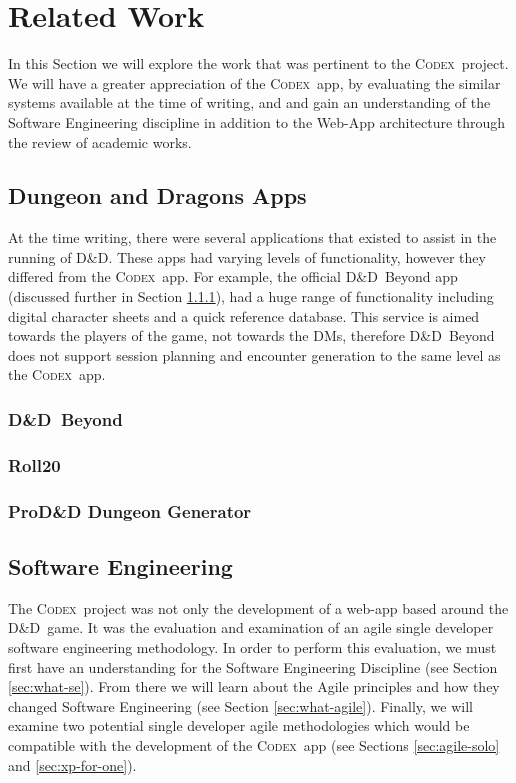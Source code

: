 \documentclass[final]{cmpreport}
\newcommand{\dnd}{D\&D}
\newcommand{\Codex}{\textsc{Codex}}
\begin{document}
	\section{Related Work} \label{sec:related}
	In this Section we will explore the work that was pertinent to the \Codex \ project. We will have a greater appreciation of the \Codex \ app, by evaluating the similar systems available at the time of writing, and and gain an understanding of the Software Engineering discipline in addition to the Web-App architecture through the review of academic works.
	
		\subsection{Dungeon and Dragons Apps} \label{sec:other-dnd-apps}
		At the time writing, there were several applications that existed to assist in the running of \dnd. These apps had varying levels of functionality, however they differed from the \Codex \ app. For example, the official \dnd \ Beyond app \citep{dnd-beyond} (discussed further in Section \ref{sec:dnd-beyond}), had a huge range of functionality including digital character sheets and a quick reference database. This service is aimed towards the players of the game, not towards the DMs, therefore \dnd \ Beyond does not support session planning and encounter generation to the same level as the \Codex \ app.
		
			\subsubsection{\dnd \ Beyond} \label{sec:dnd-beyond}
			
			\subsubsection{Roll20} \label{sec:roll20}
			
			\subsubsection{ProD\&D Dungeon Generator} \label{sec:prodnd}
	
		\subsection{Software Engineering} \label{sec:software-eng}
		The \Codex \ project was not only the development of a web-app based around the \dnd \ game. It was the evaluation and examination of an agile single developer software engineering methodology. In order to perform this evaluation, we must first have an understanding for the Software Engineering Discipline (see Section \ref{sec:what-se}). From there we will learn about the Agile principles and how they changed Software Engineering (see Section \ref{sec:what-agile}). Finally, we will examine two potential single developer agile methodologies which would be compatible with the development of the \Codex \ app (see Sections \ref{sec:agile-solo} and \ref{sec:xp-for-one}). 
			
\end{document}
